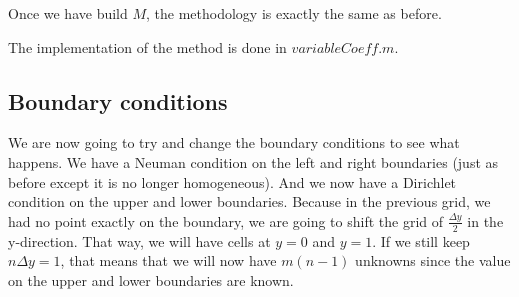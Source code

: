 Once we have build $M$, the methodology is exactly the same as before.

The implementation of the method is done in $variableCoeff.m$.



\subsection{Boundary conditions}
We are now going to try and change the boundary conditions to see what happens. We have a Neuman condition on the left and right boundaries (just as before except it is no longer homogeneous). And we now have a Dirichlet condition on the upper and lower boundaries. Because in the previous grid, we had no point exactly on the boundary, we are going to shift the grid of $\frac{\Delta y}{2}$ in the y-direction. That way, we will have cells at $y=0$ and $y=1$. If we still keep $n\Delta y =1$, that means that we will now have $m(n-1)$ unknowns since the value on the upper and lower boundaries are known.




